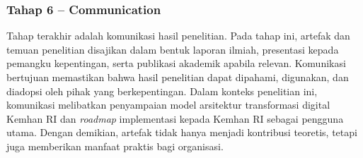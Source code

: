 \subsubsection{Tahap 6 – Communication}
Tahap terakhir adalah komunikasi hasil penelitian. Pada tahap ini, artefak dan temuan penelitian disajikan dalam bentuk laporan ilmiah, presentasi kepada pemangku kepentingan, serta publikasi akademik apabila relevan.
Komunikasi bertujuan memastikan bahwa hasil penelitian dapat dipahami, digunakan, dan diadopsi oleh pihak yang berkepentingan.
Dalam konteks penelitian ini, komunikasi melibatkan penyampaian model arsitektur transformasi digital Kemhan RI dan \textit{roadmap} implementasi kepada Kemhan RI sebagai pengguna utama.
Dengan demikian, artefak tidak hanya menjadi kontribusi teoretis, tetapi juga memberikan manfaat praktis bagi organisasi.

